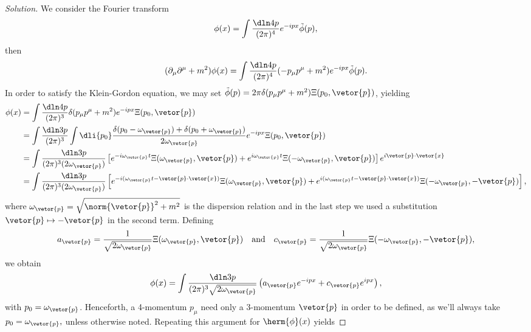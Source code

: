 \begin{proof}[Solution]
   We consider the Fourier transform
   \begin{equation*}
      \phi(x) = \int \frac{\dln4p}{(2\pi)^4} e^{-ipx}\tilde{\phi}(p),
   \end{equation*}
   then
   \begin{equation*}
      (\partial_\mu \partial^\mu + m^2)\phi(x) = \int\frac{\dln4p}{(2\pi)^4} (-p_\mu p^\mu + m^2) e^{-ipx} \tilde{\phi}(p).
   \end{equation*}
   In order to satisfy the Klein-Gordon equation, we may set \(\tilde{\phi}(p) = 2\pi \delta(p_\mu p^\mu + m^2) \Xi(p_0, \vetor{p})\), yielding
   \begin{align*}
      \phi(x) &= \int \frac{\dln4p}{(2\pi)^3} \delta(p_\mu p^\mu + m^2) e^{-ipx} \Xi(p_0, \vetor{p})\\
              &= \int \frac{\dln3p}{(2\pi)^3} \int \dli{p_0}\frac{\delta(p_0 - \omega_{\vetor{p}}) + \delta(p_0 + \omega_{\vetor{p}})}{2 \omega_{\vetor{p}}} e^{-ipx} \Xi(p_0, \vetor{p})\\
              &= \int \frac{\dln3p}{(2\pi)^3(2 \omega_{\vetor{p}})} \left[e^{-i\omega_{\vetor{p}} t} \Xi(\omega_{\vetor{p}}, \vetor{p}) + e^{i \omega_{\vetor{p}} t} \Xi(-\omega_{\vetor{p}}, \vetor{p})\right]e^{i \vetor{p} \cdot \vetor{x}}\\
              &= \int \frac{\dln3p}{(2\pi)^3(2\omega_{\vetor{p}})} \left[e^{-i(\omega_{\vetor{p}} t - \vetor{p}\cdot \vetor{x})} \Xi(\omega_{\vetor{p}}, \vetor{p}) + e^{i(\omega_{\vetor{p}} t - \vetor{p}\cdot\vetor{x})} \Xi(- \omega_{\vetor{p}}, -\vetor{p})\right],
   \end{align*}
   where \(\omega_{\vetor{p}} = \sqrt{\norm{\vetor{p}}^2 + m^2}\) is the dispersion relation and in the last step we used a substitution \(\vetor{p} \mapsto - \vetor{p}\) in the second term. Defining
   \begin{equation*}
      a_{\vetor{p}} = \frac{1}{\sqrt{2 \omega_{\vetor{p}}}}\Xi(\omega_{\vetor{p}}, \vetor{p})
      \quad\text{and}\quad
      c_{\vetor{p}} = \frac{1}{\sqrt{2 \omega_{\vetor{p}}}}\Xi(-\omega_{\vetor{p}}, -\vetor{p}),
   \end{equation*}
   we obtain
   \begin{equation*}
      \phi(x) = \int \frac{\dln3p}{(2\pi)^3 \sqrt{2\omega_{\vetor{p}}}} \left(a_{\vetor{p}} e^{-ipx} + c_{\vetor{p}} e^{ipx}\right),
   \end{equation*}
   with \(p_0 = \omega_{\vetor{p}}\). Henceforth, a 4-momentum \(p_\mu\) need only a 3-momentum \(\vetor{p}\) in order to be defined, as we'll always take \(p_0 = \omega_{\vetor{p}},\) unless otherwise noted. Repeating this argument for \(\herm{\phi}(x)\) yields

\end{proof}
